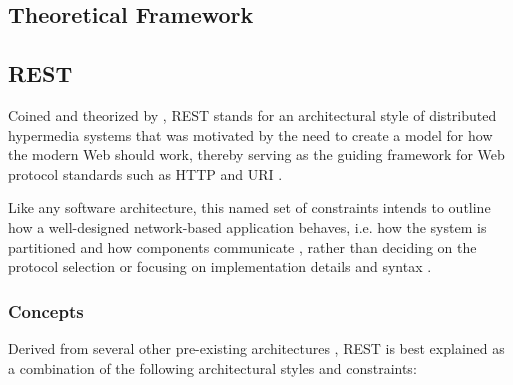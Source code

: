 \begin{appendices}


\chapter{Theoretical Framework}
\label{app:theoretical-framework}

\section{\acl{REST}}
\label{sec:rest}

Coined and theorized by \citeauthor{fielding2000architectural}, \ac{REST} stands for an architectural style of distributed hypermedia systems that was motivated by the need to create a model for how the modern Web should work, thereby serving as the guiding framework for Web protocol standards such as \acs{HTTP} and \acs{URI} \cite[pp.~76,~107]{fielding2000architectural}.

Like any software architecture, this named set of constraints intends to outline how a well-designed network-based application behaves, i.e. how the system is partitioned and how components communicate \cite[p.~xvi]{fielding2000architectural}, rather than deciding on the protocol selection or focusing on implementation details and syntax \cite[pp.~86,~109]{fielding2000architectural}.


\subsection{Concepts}
\label{sec:rest-concepts}

Derived from several other pre-existing architectures \cite[p.~76]{fielding2000architectural}, \ac{REST} is best explained as a combination of the following architectural styles and constraints:


\end{appendices}
